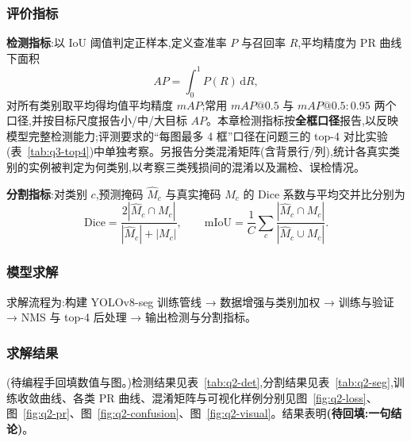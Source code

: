 \subsubsection{评价指标}

\textbf{检测指标}:以 IoU 阈值判定正样本,定义查准率 $P$ 与召回率 $R$,平均精度为 PR 曲线下面积
\[
AP=\int_0^1 P(R)\,\mathrm{d}R,
\]
对所有类别取平均得均值平均精度 $mAP$;常用 $mAP@0.5$ 与 $mAP@0.5:0.95$ 两个口径,并按目标尺度报告小/中/大目标 $AP$。本章检测指标按\textbf{全框口径}报告,以反映模型完整检测能力;评测要求的“每图最多 4 框”口径在问题三的 top-4 对比实验(表~\ref{tab:q3-top4})中单独考察。另报告分类混淆矩阵(含背景行/列),统计各真实类别的实例被判定为何类别,以考察三类残损间的混淆以及漏检、误检情况。

\textbf{分割指标}:对类别 $c$,预测掩码 $\hat{M}_c$ 与真实掩码 $M_c$ 的 Dice 系数与平均交并比分别为
\[
\mathrm{Dice}=\frac{2|\hat{M}_c\cap M_c|}{|\hat{M}_c|+|M_c|},\qquad
\mathrm{mIoU}=\frac{1}{C}\sum_{c}\frac{|\hat{M}_c\cap M_c|}{|\hat{M}_c\cup M_c|}.
\]

\subsubsection{模型求解}

求解流程为:构建 YOLOv8-seg 训练管线 → 数据增强与类别加权 → 训练与验证 → NMS 与 top-4 后处理 → 输出检测与分割指标。

\subsubsection{求解结果}

(待编程手回填数值与图。)检测结果见表~\ref{tab:q2-det},分割结果见表~\ref{tab:q2-seg},训练收敛曲线、各类 PR 曲线、混淆矩阵与可视化样例分别见图~\ref{fig:q2-loss}、图~\ref{fig:q2-pr}、图~\ref{fig:q2-confusion}、图~\ref{fig:q2-visual}。结果表明\textbf{(待回填:一句结论)}。

